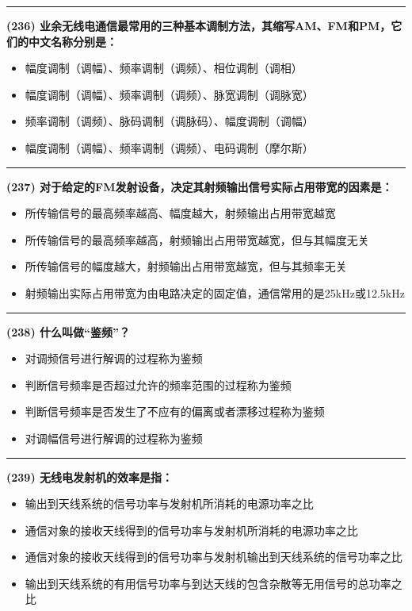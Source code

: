 \documentclass[twocolumn]{ctexart}  %
\begin{document}
\noindent\rule{0.5\textwidth}{1pt}
\heiti \textbf{(236) 业余无线电通信最常用的三种基本调制方法，其缩写AM、FM和PM，它们的中文名称分别是：} \songti {\color{gray} [LK0784] }
\begin{itemize}
	\item  幅度调制（调幅）、频率调制（调频）、相位调制（调相）
	\item  幅度调制（调幅）、频率调制（调频）、脉宽调制（调脉宽）
	\item  频率调制（调频）、脉码调制（调脉码）、幅度调制（调幅）
	\item  幅度调制（调幅）、频率调制（调频）、电码调制（摩尔斯）
\end{itemize}


\noindent\rule{0.5\textwidth}{1pt}
\heiti \textbf{(237) 对于给定的FM发射设备，决定其射频输出信号实际占用带宽的因素是：} \songti {\color{gray} [LK0786] }
\begin{itemize}
	\item  所传输信号的最高频率越高、幅度越大，射频输出占用带宽越宽
	\item  所传输信号的最高频率越高，射频输出占用带宽越宽，但与其幅度无关
	\item  所传输信号的幅度越大，射频输出占用带宽越宽，但与其频率无关
	\item  射频输出实际占用带宽为由电路决定的固定值，通信常用的是25kHz或12.5kHz
\end{itemize}


\noindent\rule{0.5\textwidth}{1pt}
\heiti \textbf{(238) 什么叫做“鉴频”？} \songti {\color{gray} [LK0791] }
\begin{itemize}
	\item  对调频信号进行解调的过程称为鉴频
	\item  判断信号频率是否超过允许的频率范围的过程称为鉴频
	\item  判断信号频率是否发生了不应有的偏离或者漂移过程称为鉴频
	\item  对调幅信号进行解调的过程称为鉴频
\end{itemize}


\noindent\rule{0.5\textwidth}{1pt}
\heiti \textbf{(239) 无线电发射机的效率是指：} \songti {\color{gray} [LK0813] }
\begin{itemize}
	\item  输出到天线系统的信号功率与发射机所消耗的电源功率之比
	\item  通信对象的接收天线得到的信号功率与发射机所消耗的电源功率之比
	\item  通信对象的接收天线得到的信号功率与发射机输出到天线系统的信号功率之比
	\item  输出到天线系统的有用信号功率与到达天线的包含杂散等无用信号的总功率之比
\end{itemize}
\end{document}
